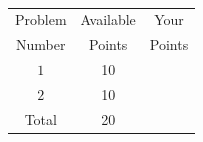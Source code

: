 \documentclass[]{exam}
\numberwithin{equation}{section}
\begin{document}
\clearpage
\normalsize
\
\vspace{.5cm}

\huge
\begin{center}
\begin{tabular}{|c|c|c|}
\hline
Problem  & Available  &   Your  \\
Number & Points &    Points  \\	\hline\hline

 $1$  & 10  &   \\	\hline
 $2$  & 10  &   \\	\hline

Total & 20  & \\ \hline
\end{tabular}
\end{center}

\pagebreak
\end{document}
